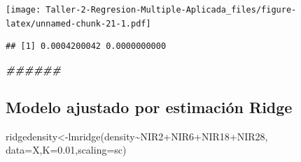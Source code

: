 \documentclass[
]{article}
\newenvironment{Shaded}{\begin{snugshade}}{\end{snugshade}}
\newcommand{\AttributeTok}[1]{\textcolor[rgb]{0.77,0.63,0.00}{#1}}
\newcommand{\DecValTok}[1]{\textcolor[rgb]{0.00,0.00,0.81}{#1}}
\newcommand{\DocumentationTok}[1]{\textcolor[rgb]{0.56,0.35,0.01}{\textbf{\textit{#1}}}}
\newcommand{\FloatTok}[1]{\textcolor[rgb]{0.00,0.00,0.81}{#1}}
\newcommand{\FunctionTok}[1]{\textcolor[rgb]{0.00,0.00,0.00}{#1}}
\newcommand{\NormalTok}[1]{#1}
\newcommand{\OtherTok}[1]{\textcolor[rgb]{0.56,0.35,0.01}{#1}}
\newcommand{\SpecialCharTok}[1]{\textcolor[rgb]{0.00,0.00,0.00}{#1}}
\newcommand{\StringTok}[1]{\textcolor[rgb]{0.31,0.60,0.02}{#1}}
\begin{document}
\begin{Shaded}
\end{Shaded}

\texttt{[image: Taller-2-Regresion-Multiple-Aplicada\_files/figure-latex/unnamed-chunk-21-1.pdf]}

\begin{Shaded}
\end{Shaded}

\begin{verbatim}
## [1] 0.0004200042 0.0000000000
\end{verbatim}

\begin{Shaded}
\begin{Highlighting}[]
\DocumentationTok{\#\#\#\#\#\#}
\end{Highlighting}
\end{Shaded}

\hypertarget{modelo-ajustado-por-estimaciuxf3n-ridge}{%
\subsection{Modelo ajustado por estimación
Ridge}\label{modelo-ajustado-por-estimaciuxf3n-ridge}}

\begin{Shaded}
\begin{Highlighting}[]
\NormalTok{ridgedensity}\OtherTok{\textless{}{-}}\FunctionTok{lmridge}\NormalTok{(density}\SpecialCharTok{\textasciitilde{}}\NormalTok{NIR2}\SpecialCharTok{+}\NormalTok{NIR6}\SpecialCharTok{+}\NormalTok{NIR18}\SpecialCharTok{+}\NormalTok{NIR28,}
                      \AttributeTok{data=}\NormalTok{X,}\AttributeTok{K=}\FloatTok{0.01}\NormalTok{,}\AttributeTok{scaling=}\StringTok{\textquotesingle{}sc\textquotesingle{}}\NormalTok{)}
\end{Highlighting}
\end{Shaded}
\end{document}

